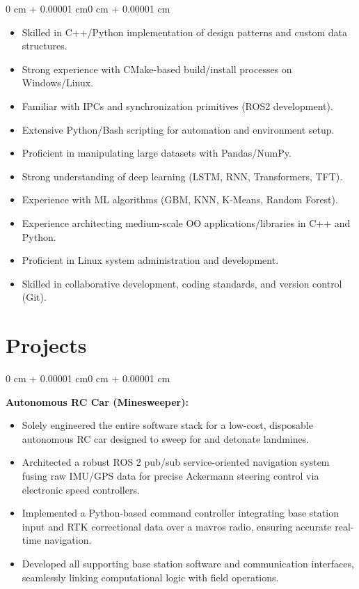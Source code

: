\documentclass[10pt, letterpaper]{article}
\newenvironment{highlights}{
    \begin{itemize}[
        topsep=0.10 cm,
        parsep=0.10 cm,
        partopsep=0pt,
        itemsep=0pt,
        leftmargin=0 cm + 10pt
    ]
}{
    \end{itemize}
}
\newenvironment{onecolentry}{
    \begin{adjustwidth}{0 cm + 0.00001 cm}{0 cm + 0.00001 cm}
}{
    \end{adjustwidth}
}
\begin{document}
\begin{onecolentry}
    \begin{highlights}
        \item Skilled in C++/Python implementation of design patterns and custom data structures.
        \item Strong experience with CMake-based build/install processes on Windows/Linux.
        \item Familiar with IPCs and synchronization primitives (ROS2 development).
        \item Extensive Python/Bash scripting for automation and environment setup.
        \item Proficient in manipulating large datasets with Pandas/NumPy.
        \item Strong understanding of deep learning (LSTM, RNN, Transformers, TFT).
        \item Experience with ML algorithms (GBM, KNN, K-Means, Random Forest).
        \item Experience architecting medium-scale OO applications/libraries in C++ and Python.
        \item Proficient in Linux system administration and development.
        \item Skilled in collaborative development, coding standards, and version control (Git).
    \end{highlights}
\end{onecolentry}

\section{Projects}

\vspace{0.2 cm}

\begin{onecolentry}
    \textbf{Autonomous RC Car (Minesweeper):}
    \begin{highlights}
        \item Solely engineered the entire software stack for a low-cost, disposable autonomous RC car designed to sweep for and detonate landmines.
        \item Architected a robust ROS 2 pub/sub service-oriented navigation system fusing raw IMU/GPS data for precise Ackermann steering control via electronic speed controllers.
        \item Implemented a Python-based command controller integrating base station input and RTK correctional data over a mavros radio, ensuring accurate real-time navigation.
        \item Developed all supporting base station software and communication interfaces, seamlessly linking computational logic with field operations.
    \end{highlights}
\end{onecolentry}
\end{document}
